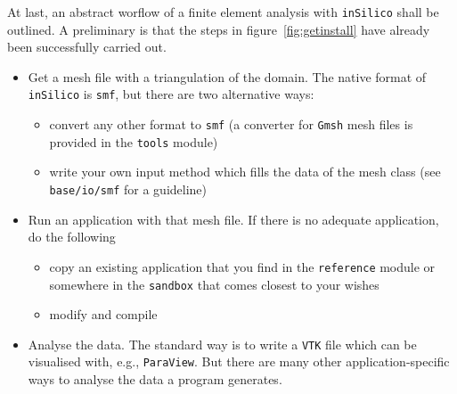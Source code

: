 \documentclass[a4paper,DIV=12,10pt]{scrartcl}
\newcommand{\IS}[0]{\texttt{inSilico}}
\begin{document}
At last, an abstract worflow of a finite element analysis with \IS{}
shall be outlined. A preliminary is that the steps in
figure~\ref{fig:getinstall} have already been successfully carried
out.
\begin{itemize}
\item Get a mesh file with a triangulation of the domain. The native
  format of \IS{} is \texttt{smf}, but there are two alternative ways:
  \begin{itemize}
  \item convert any other format to \texttt{smf} (a converter for
    \texttt{Gmsh} mesh files is provided in the \texttt{tools} module)
  \item write your own input method which fills the data of the
    mesh class (see \texttt{base/io/smf} for a guideline)
  \end{itemize}
\item Run an application with that mesh file. If there is no adequate application,
  do the following
  \begin{itemize}
  \item copy an existing application that you find in the
    \texttt{reference} module or somewhere in the \texttt{sandbox}
    that comes closest to your wishes
  \item modify and compile
  \end{itemize}
\item Analyse the data. The standard way is to write a \texttt{VTK}
  file which can be visualised with, e.g., \texttt{ParaView}. But
  there are many other application-specific ways to analyse the data
  a program generates.
\end{itemize}
\end{document}
